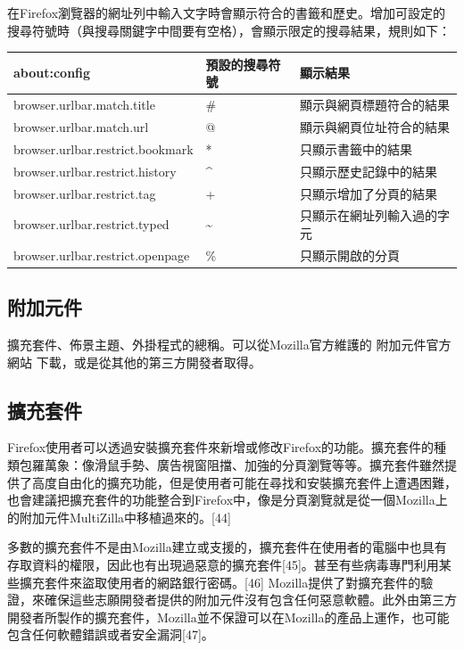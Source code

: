 \documentclass[12pt, a4paper]{article}
\begin{document}
在Firefox瀏覽器的網址列中輸入文字時會顯示符合的書籤和歷史。增加可設定的搜尋符號時（與搜尋關鍵字中間要有空格），會顯示限定的搜尋結果，規則如下：

\begin{adjustbox}{center}
\footnotesize\linespread{1.2}\centering\begin{tabular}{lll} \hline
about:config &  預設的搜尋符號 & 顯示結果\\ \hline
browser.urlbar.match.title & \# & 顯示與網頁標題符合的結果\\
browser.urlbar.match.url & @ & 顯示與網頁位址符合的結果\\
browser.urlbar.restrict.bookmark & * & 只顯示書籤中的結果\\
browser.urlbar.restrict.history & \^{} & 只顯示歷史記錄中的結果\\
browser.urlbar.restrict.tag & + & 只顯示增加了分頁的結果\\
browser.urlbar.restrict.typed & \~{} & 只顯示在網址列輸入過的字元\\
browser.urlbar.restrict.openpage & \% & 只顯示開啟的分頁\\ \hline
\end{tabular}
\end{adjustbox}

\subsection{附加元件}

擴充套件、佈景主題、外掛程式的總稱。可以從Mozilla官方維護的 附加元件官方網站 下載，或是從其他的第三方開發者取得。

\subsection{擴充套件}

Firefox使用者可以透過安裝擴充套件來新增或修改Firefox的功能。擴充套件的種類包羅萬象：像滑鼠手勢、廣告視窗阻擋、加強的分頁瀏覽等等。擴充套件雖然提供了高度自由化的擴充功能，但是使用者可能在尋找和安裝擴充套件上遭遇困難，也會建議把擴充套件的功能整合到Firefox中，像是分頁瀏覽就是從一個Mozilla上的附加元件MultiZilla中移植過來的。[44]

多數的擴充套件不是由Mozilla建立或支援的，擴充套件在使用者的電腦中也具有存取資料的權限，因此也有出現過惡意的擴充套件[45]。甚至有些病毒專門利用某些擴充套件來盜取使用者的網路銀行密碼。[46] Mozilla提供了對擴充套件的驗證，來確保這些志願開發者提供的附加元件沒有包含任何惡意軟體。此外由第三方開發者所製作的擴充套件，Mozilla並不保證可以在Mozilla的產品上運作，也可能包含任何軟體錯誤或者安全漏洞[47]。
\end{document}
